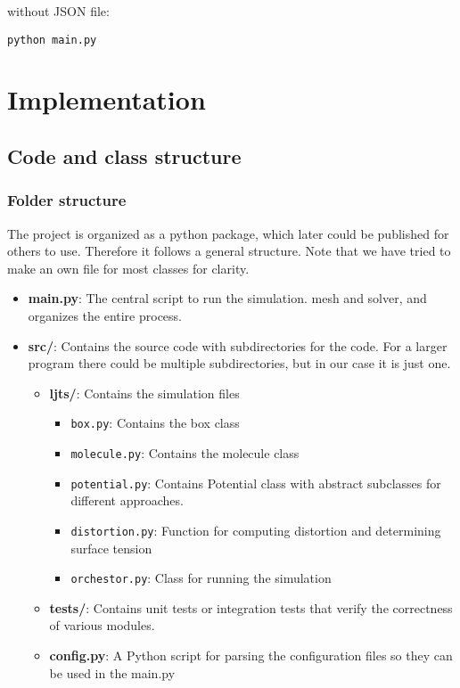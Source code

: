 \documentclass{article}
\begin{document}
without JSON file:

\begin{verbatim}
python main.py
\end{verbatim}


\section{Implementation}

\subsection*{Code and class structure}

\subsubsection*{Folder structure}

The project is organized as a python package, which later could be published for others to use. Therefore it follows a general structure. Note that we have tried to make an own file for most classes for clarity.

\begin{itemize}
    \item \textbf{main.py}: The central script to run the simulation.
    mesh and solver, and organizes the entire process.
    \item \textbf{src/}: Contains the source code with subdirectories for the code. For a larger program there could be multiple subdirectories, but in our case it is just one.
    \begin{itemize}
        \item \textbf{ljts/}: Contains the simulation files
        \begin{itemize}
            \item \texttt{box.py}: Contains the box class 
            \item \texttt{molecule.py}: Contains the molecule class
            \item \texttt{potential.py}: Contains Potential class with abstract subclasses for different approaches.
            \item \texttt{distortion.py}: Function for computing distortion and determining surface tension
            \item \texttt{orchestor.py}: Class for running the simulation
    \end{itemize}
    \item \textbf{tests/}: Contains unit tests or integration tests
    that verify the correctness of various modules.
    \item \textbf{config.py}: A Python script for parsing the configuration files so they can be used in the main.py
\end{itemize}
\end{itemize}
\end{document}
